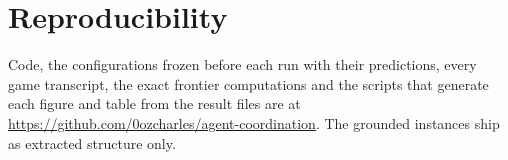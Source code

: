 \section*{Reproducibility}
Code, the configurations frozen before each run with their predictions, every game transcript, the exact frontier computations and the scripts that generate each figure and table from the result files are at \url{https://github.com/0ozcharles/agent-coordination}. The grounded instances ship as extracted structure only.


